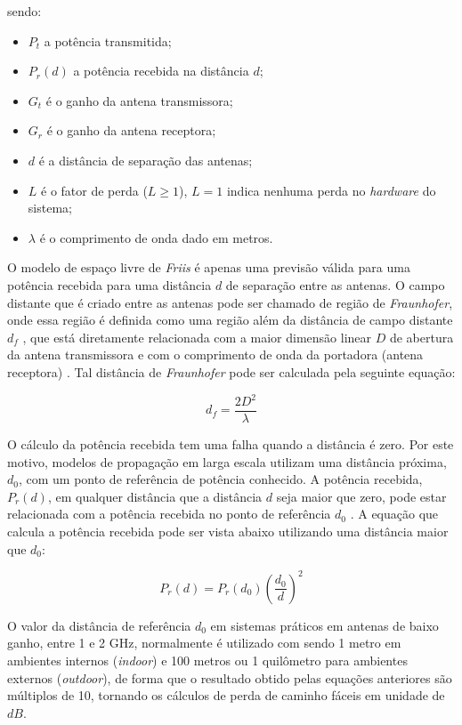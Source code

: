 \documentclass[
	12pt,				%
	twoside,			%
	a4paper,			%
	english,			%
	french,				%
	spanish,			%
	brazil				%
	]{abntex2}
\begin{document}
sendo:

\begin{itemize}
\item
  \(P_{t}\) a potência transmitida;
\item
  \(P_{r}(d)\) a potência recebida na distância \(d\);
\item
  \(G_{t}\) é o ganho da antena transmissora;
\item
  \(G_{r}\) é o ganho da antena receptora;
\item
  \(d\) é a distância de separação das antenas;
\item
  \(L\) é o fator de perda (\(L\geq1\)), \(L = 1\) indica nenhuma perda
  no \emph{hardware} do sistema;
\item
  \(\lambda\) é o comprimento de onda dado em metros.
\end{itemize}

O modelo de espaço livre de \emph{Friis} é apenas uma previsão válida
para uma potência recebida para uma distância \(d\) de separação entre
as antenas. O campo distante que é criado entre as antenas pode ser
chamado de região de \emph{Fraunhofer}, onde essa região é definida como
uma região além da distância de campo distante \(d_{f}\) , que está
diretamente relacionada com a maior dimensão linear \(D\) de abertura da
antena transmissora e com o comprimento de onda da portadora (antena
receptora) \cite{RAPPAPORT}. Tal distância de \emph{Fraunhofer} pode ser
calculada pela seguinte equação:

\begin{equation}
    d_{f} =  \frac{2D^{2}}{\lambda}
\end{equation}

O cálculo da potência recebida tem uma falha quando a distância é zero.
Por este motivo, modelos de propagação em larga escala utilizam uma
distância próxima, \(d_{0}\), com um ponto de referência de potência
conhecido. A potência recebida, \(P_{r}(d)\), em qualquer distância que
a distância \(d\) seja maior que zero, pode estar relacionada com a
potência recebida no ponto de referência \(d_{0}\) \cite{RAPPAPORT}. A
equação que calcula a potência recebida pode ser vista abaixo utilizando
uma distância maior que \(d_{0}\):

\begin{equation}
    P_{r}(d) = P_{r}(d_{0})(\frac{d_{0}}{d})^{2}
\end{equation}

O valor da distância de referência \(d_{0}\) em sistemas práticos em
antenas de baixo ganho, entre 1 e 2 GHz, normalmente é utilizado com
sendo 1 metro em ambientes internos (\emph{indoor}) e 100 metros ou 1
quilômetro para ambientes externos (\emph{outdoor}), de forma que o
resultado obtido pelas equações anteriores são múltiplos de 10, tornando
os cálculos de perda de caminho fáceis em unidade de \(dB\).
\end{document}
